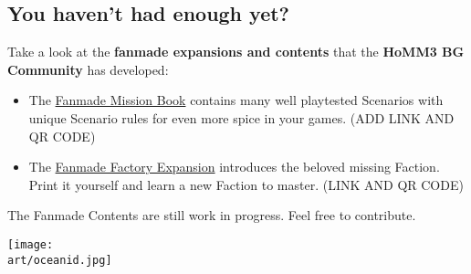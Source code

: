 \begin{multicols*}{2}
\subsection*{You haven't had enough yet?}
Take a look at the \textbf{fanmade expansions and contents} that the \textbf{HoMM3 BG Community} has developed:
  \begin{itemize}
    \item The \href{https://github.com/qwrtln/Homm3BG-mission-book}{Fanmade Mission Book} contains many well playtested Scenarios with unique Scenario rules for even more spice in your games. (ADD LINK AND QR CODE)
    \item The \href{https://github.com/piotrbruzda/Homm3BG-FactoryRulebook}{Fanmade Factory Expansion} introduces the beloved missing Faction. Print it yourself and learn a new Faction to master. (LINK AND QR CODE)
  \end{itemize}
The Fanmade Contents are still work in progress. Feel free to contribute.

\texttt{[image: \\art/oceanid.jpg]}

\end{multicols*}
